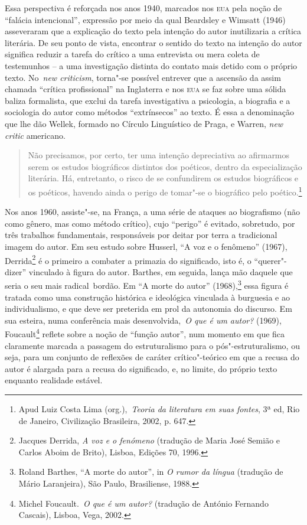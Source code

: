 Essa perspectiva é reforçada nos anos 1940, marcados nos \textsc{eua}
pela noção de ``falácia intencional'', expressão por meio da qual
Beardsley e Wimsatt (1946) asseveraram que a explicação do texto pela
intenção do autor inutilizaria a crítica literária. De seu ponto de
vista, encontrar o sentido do texto na intenção do autor significa
reduzir a tarefa do crítico a uma entrevista ou mera coleta de
testemunhos -- a uma investigação distinta do contato mais detido com o
próprio texto. No~\emph{new criticism}, torna"-se possível entrever que a
ascensão da assim chamada ``crítica profissional'' na Inglaterra e nos
\textsc{eua} se faz sobre uma sólida baliza formalista, que exclui da
tarefa investigativa a psicologia, a biografia e a sociologia do autor
como métodos ``extrínsecos'' ao texto. É essa a denominação que lhe dão
Wellek, formado no Círculo Linguístico de Praga, e Warren, \emph{new
critic} americano.

\begin{quote}
Não precisamos, por certo, ter uma intenção depreciativa ao afirmarmos
serem os estudos biográficos distintos dos poéticos, dentro da
especialização literária. Há, entretanto, o risco de se confundirem os
estudos biográficos e os poéticos, havendo ainda o perigo de tomar"-se o
biográfico pelo poético.\footnote{Apud Luiz Costa Lima
  (org.),~\emph{Teoria da literatura em suas fontes}, 3ª ed, Rio de
  Janeiro, Civilização Brasileira, 2002, p. 647.}
\end{quote}

Nos anos 1960, assiste"-se, na França, a uma série de ataques ao
biografismo (não como gênero, mas como método crítico), cujo ``perigo''
é evitado, sobretudo, por três trabalhos fundamentais, responsáveis por
deitar por terra a tradicional imagem do autor. Em seu estudo sobre
Husserl, ``A voz e o fenômeno'' (1967), Derrida\footnote{Jacques
  Derrida, \emph{A voz e o fenómeno} (tradução de Maria José Semião e
  Carlos Aboim de Brito), Lisboa, Edições 70, 1996.} é o primeiro a
combater a primazia do significado, isto é, o ``querer"-dizer'' vinculado
à figura do autor. Barthes, em seguida, lança mão daquele que seria o
seu mais radical~bordão. Em ``A morte do autor'' (1968),\footnote{Roland
  Barthes, ``A morte do autor'', in \emph{O rumor da língua} (tradução
  de Mário Laranjeira), São Paulo, Brasiliense, 1988.} essa figura é
tratada como uma construção histórica e ideológica vinculada à burguesia
e ao individualismo, e que deve ser preterida em prol da autonomia do
discurso. Em sua esteira, numa conferência mais desenvolvida,~\emph{O
que é um autor?} (1969), Foucault\footnote{Michel Foucault.~\emph{O que
  é um autor?} (tradução de António Fernando Cascais), Lisboa, Vega,
  2002.} reflete sobre a noção de ``função autor'', num momento em que
fica claramente marcada a passagem do estruturalismo para o
pós"-estruturalismo, ou seja, para um conjunto de reflexões de caráter
crítico"-teórico em que a recusa do autor é alargada para a recusa do
significado, e, no limite, do próprio texto enquanto realidade estável.

